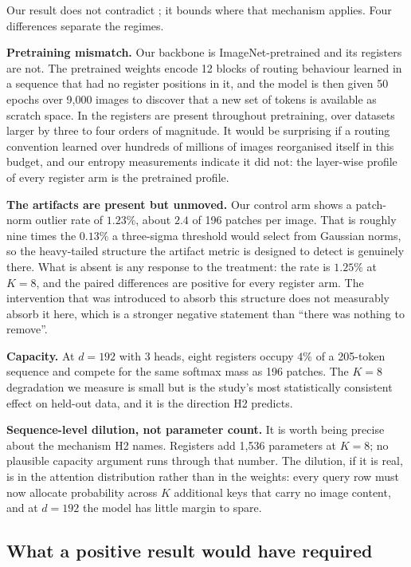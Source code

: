 Our result does not contradict \cite{darcet2024registers}; it bounds where that
mechanism applies. Four differences separate the regimes.

\textbf{Pretraining mismatch.} Our backbone is ImageNet-pretrained and its
registers are not. The pretrained weights encode 12 blocks of routing behaviour
learned in a sequence that had no register positions in it, and the model is
then given 50 epochs over 9{,}000 images to discover that a new set of tokens is
available as scratch space. In \cite{darcet2024registers} the registers are
present throughout pretraining, over datasets larger by three to four orders of
magnitude. It would be surprising if a routing convention learned over hundreds
of millions of images reorganised itself in this budget, and our entropy
measurements indicate it did not: the layer-wise profile of every register arm
is the pretrained profile.

\textbf{The artifacts are present but unmoved.} Our control arm shows a
patch-norm outlier rate of $1.23\%$, about $2.4$ of 196 patches per image. That
is roughly nine times the $0.13\%$ a three-sigma threshold would select from
Gaussian norms, so the heavy-tailed structure the artifact metric is designed to
detect is genuinely there. What is absent is any response to the treatment: the
rate is $1.25\%$ at $K=8$, and the paired differences are positive for every
register arm. The intervention that was introduced to absorb this structure does
not measurably absorb it here, which is a stronger negative statement than
``there was nothing to remove''.

\textbf{Capacity.} At $d = 192$ with 3 heads, eight registers occupy $4\%$ of a
205-token sequence and compete for the same softmax mass as 196 patches. The
$K=8$ degradation we measure is small but is the study's most statistically
consistent effect on held-out data, and it is the direction H2 predicts.

\textbf{Sequence-level dilution, not parameter count.} It is worth being precise
about the mechanism H2 names. Registers add 1{,}536 parameters at $K=8$; no
plausible capacity argument runs through that number. The dilution, if it is
real, is in the attention distribution rather than in the weights: every query
row must now allocate probability across $K$ additional keys that carry no image
content, and at $d = 192$ the model has little margin to spare.

\subsection{What a positive result would have required}

